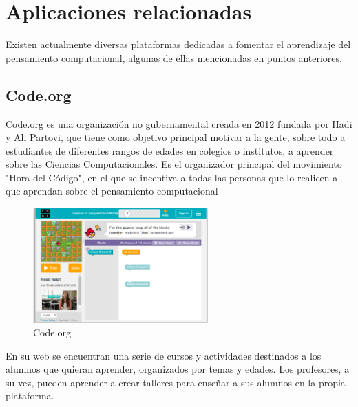 
\section{Aplicaciones relacionadas}
\label{2:sec:2}

Existen actualmente diversas plataformas dedicadas a fomentar el aprendizaje del pensamiento computacional, algunas de ellas mencionadas en puntos anteriores.


\subsection{Code.org}
\label{2:sec:1}

Code.org es una organización no gubernamental creada en 2012 fundada por Hadi y Ali Partovi, que tiene como objetivo principal motivar a la gente, sobre todo a estudiantes de diferentes rangos de edades en colegios o institutos, a aprender sobre las Ciencias Computacionales. Es el organizador principal del movimiento "Hora del Código", en el que se incentiva a todas las personas que lo realicen a que aprendan sobre el
pensamiento computacional

\begin{figure}[!th]
\begin{center}
\includegraphics[width=0.6\textwidth]{images/captura_code.eps}
\caption{Code.org}
\label{fig:1}
\end{center}
\end{figure}

En su web se encuentran una serie de cursos y actividades destinados a los alumnos que quieran aprender, organizados por temas y edades. Los profesores, a su vez, pueden aprender a crear talleres para enseñar a sus alumnos en la propia plataforma.

